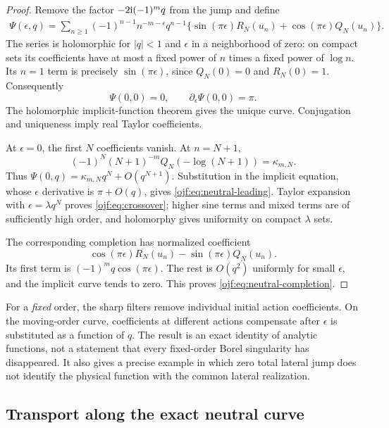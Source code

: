 \begin{proof}
Remove the factor $-2\mathrm{i}(-1)^m q$ from the jump and define
\begin{align}
 \Psi(\epsilon,q)=\sum_{n\ge1}(-1)^{n-1}n^{-m-\epsilon}q^{n-1}
 \{\sin(\pi\epsilon)R_N(u_n)+
                  \cos(\pi\epsilon)Q_N(u_n)\}.\label{ojf:eq:Psi}
\end{align}
The series is holomorphic for $|q|<1$ and $\epsilon$ in a neighborhood
of zero: on compact sets its coefficients have at most a fixed power of
$n$ times a fixed power of $\log n$. Its $n=1$ term is precisely
$\sin(\pi\epsilon)$, since $Q_N(0)=0$ and $R_N(0)=1$.
Consequently
\[
 \Psi(0,0)=0,\qquad \partial_\epsilon\Psi(0,0)=\pi.
\]
The holomorphic implicit-function theorem gives the unique curve.
Conjugation and uniqueness imply real Taylor coefficients.

At $\epsilon=0$, the first $N$ coefficients vanish. At $n=N+1$,
\[
 (-1)^N(N+1)^{-m}Q_N(-\log(N+1))=\kappa_{m,N}.
\]
Thus $\Psi(0,q)=\kappa_{m,N}q^N+O(q^{N+1})$. Substitution in the
implicit equation, whose $\epsilon$ derivative is $\pi+O(q)$, gives
\eqref{ojf:eq:neutral-leading}. Taylor expansion with
$\epsilon=\lambda q^N$ proves \eqref{ojf:eq:crossover}; higher sine
terms and mixed terms are of sufficiently high order, and holomorphy
gives uniformity on compact $\lambda$ sets.

The corresponding completion has normalized coefficient
\[
 \cos(\pi\epsilon)R_N(u_n)-\sin(\pi\epsilon)Q_N(u_n).
\]
Its first term is $(-1)^m q\cos(\pi\epsilon)$. The rest is $O(q^2)$
uniformly for small $\epsilon$, and the implicit curve tends to zero.
This proves \eqref{ojf:eq:neutral-completion}.
\end{proof}

\begin{remark}
For a \emph{fixed} order, the sharp filters remove individual initial
action coefficients. On the moving-order curve, coefficients at different
actions compensate after $\epsilon$ is substituted as a function of $q$.
The result is an exact identity of analytic functions, not a statement
that every fixed-order Borel singularity has disappeared. It also gives
a precise example in which zero total lateral jump does not identify the
physical function with the common lateral realization.
\end{remark}

\subsection{Transport along the exact neutral curve}
\label{ojf:sec:neutral-inverse}

